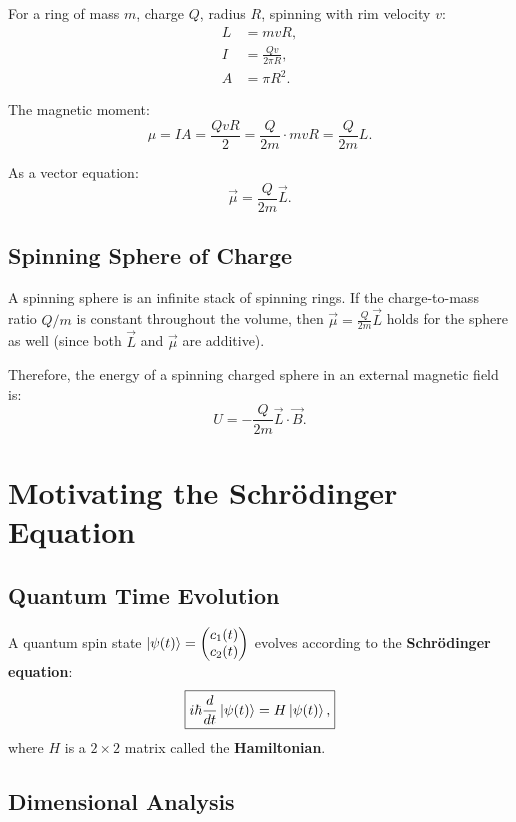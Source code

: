 \documentclass[11pt,a4paper]{article}
\theoremstyle{definition}
\theoremstyle{plain}
\theoremstyle{remark}
\begin{document}
For a ring of mass $m$, charge $Q$, radius $R$, spinning with rim velocity $v$:
\begin{align}
    L &= mvR, \\
    I &= \frac{Qv}{2\pi R}, \\
    A &= \pi R^2.
\end{align}

The magnetic moment:
\[
    \mu = IA = \frac{QvR}{2} = \frac{Q}{2m}\cdot mvR = \frac{Q}{2m}L.
\]

As a vector equation:
\[
    \boxed{\vec{\mu} = \frac{Q}{2m}\vec{L}.}
\]

\subsection{Spinning Sphere of Charge}

A spinning sphere is an infinite stack of spinning rings. If the charge-to-mass ratio $Q/m$ is constant throughout the volume, then $\vec{\mu} = \frac{Q}{2m}\vec{L}$ holds for the sphere as well (since both $\vec{L}$ and $\vec{\mu}$ are additive).

Therefore, the energy of a spinning charged sphere in an external magnetic field is:
\[
    \boxed{U = -\frac{Q}{2m}\vec{L}\cdot\vec{B}.}
\]

\section{Motivating the Schr\"odinger Equation}

\subsection{Quantum Time Evolution}

A quantum spin state $\ket{\psi(t)} = \begin{pmatrix}c_1(t)\\c_2(t)\end{pmatrix}$ evolves according to the \textbf{Schr\"odinger equation}:
\[
    \boxed{i\hbar\frac{d}{dt}\ket{\psi(t)} = H\ket{\psi(t)},}
\]
where $H$ is a $2\times 2$ matrix called the \textbf{Hamiltonian}.

\subsection{Dimensional Analysis}
\end{document}
